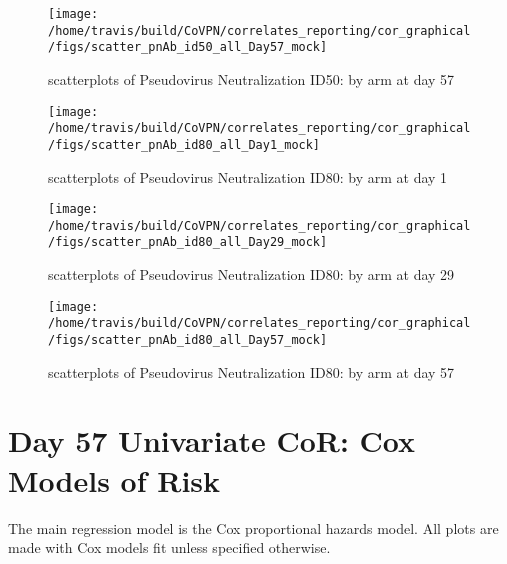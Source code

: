 \documentclass[]{book}
\theoremstyle{definition}
\theoremstyle{definition}
\theoremstyle{definition}
\newcommand{\1}{\mathbbm{1}}
\begin{document}
\clearpage
\begin{figure}[H]

{\centering \texttt{[image: /home/travis/build/CoVPN/correlates\_reporting/cor\_graphical/figs/scatter\_pnAb\_id50\_all\_Day57\_mock]} 

}

\caption{scatterplots of Pseudovirus Neutralization ID50: by arm at day 57}\label{fig:unnamed-chunk-271}
\end{figure}

\clearpage
\begin{figure}[H]

{\centering \texttt{[image: /home/travis/build/CoVPN/correlates\_reporting/cor\_graphical/figs/scatter\_pnAb\_id80\_all\_Day1\_mock]} 

}

\caption{scatterplots of Pseudovirus Neutralization ID80: by arm at day 1}\label{fig:unnamed-chunk-272}
\end{figure}

\clearpage
\begin{figure}[H]

{\centering \texttt{[image: /home/travis/build/CoVPN/correlates\_reporting/cor\_graphical/figs/scatter\_pnAb\_id80\_all\_Day29\_mock]} 

}

\caption{scatterplots of Pseudovirus Neutralization ID80: by arm at day 29}\label{fig:unnamed-chunk-273}
\end{figure}

\clearpage
\begin{figure}[H]

{\centering \texttt{[image: /home/travis/build/CoVPN/correlates\_reporting/cor\_graphical/figs/scatter\_pnAb\_id80\_all\_Day57\_mock]} 

}

\caption{scatterplots of Pseudovirus Neutralization ID80: by arm at day 57}\label{fig:unnamed-chunk-274}
\end{figure}

\hypertarget{cor-coxph-Day57}{%
\chapter{Day 57 Univariate CoR: Cox Models of Risk}\label{cor-coxph-Day57}}

The main regression model is the Cox proportional hazards model. All plots are made with Cox models fit unless specified otherwise.
\end{document}
